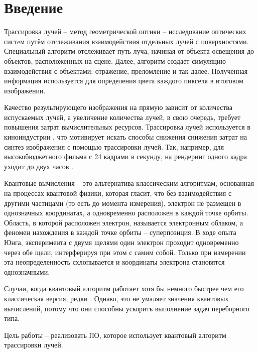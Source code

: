 \chapter*{Введение}

Трассировка лучей -- метод геометрической оптики -- исследование оптических систeм путём отслеживания взаимодействия отдельных лучей с поверхностями. Специальный алгоритм отслеживает путь луча, начиная от объекта освещения до объектов, расположенных на сцене. Далее, алгоритм создает симуляцию взаимодействия с объектами: отражение, преломление и так далее. Полученная информация используется для определения цвета каждого пикселя в итоговом изображении. 

Качество результирующего изображения на прямую зависит от количества испускаемых лучей, а увеличение количества лучей, в свою очередь, требует повышения затрат вычислительных ресурсов. Трассировка лучей используется в киноиндустрии \cite{path-traced-movies}, что мотивирует искать способы снижения снижения затрат на синтез изображения с помощью трассировки лучей. Так, например, для высокобюджетного фильма с 24 кадрами в секунду, на рендеринг одного кадра уходит до двух часов \cite{path-traced-movies}.

Квантовые вычисления -- это альтернатива классическим алгоритмам, основанная на процессах квантовой физики, которая гласит, что без взаимодействия с другими частицами (то есть до момента измерения), электрон не размещен в однозначных координатах, а одновременно расположен в каждой точке орбиты. Область, в которой расположен электрон, называется электронным облаком, а феномен нахождения в каждой точке орбиты -- суперпозиция. В ходе опыта Юнга, эксперимента с двумя щелями один электрон проходит одновременно через обе щели, интерферируя при этом с самим собой. Только при измерении эта неопределенность схлопывается и координаты электрона становятся однозначными.

Случаи, когда квантовый алгоритм работает хотя бы немного быстрее чем его классическая версия, редки \cite{quantum-computers-speed-up}. Однако, это не умаляет значения квантовых вычислений, потому что они способны ускорить выполнение задач переборного типа. 

Цель работы -- реализовать ПО, которое использует квантовый алгоритм трассировки лучей.

